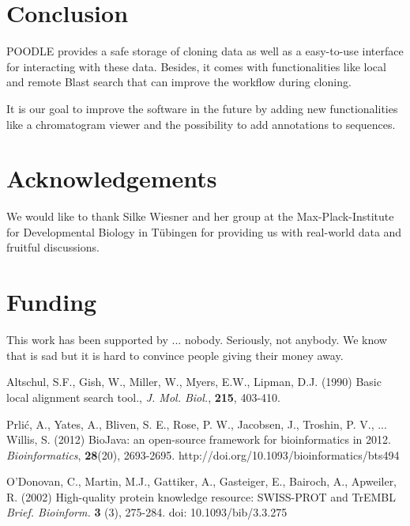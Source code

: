 \documentclass{bioinfo}
\begin{document}
\section{Conclusion}

POODLE provides a safe storage of cloning data as well as a easy-to-use interface for 
interacting with these data. Besides, it comes with functionalities like local and remote Blast 
search that can improve the workflow during cloning. 

It is our goal to improve the software in the future by adding new functionalities like a chromatogram 
viewer and the possibility to add annotations to sequences. 

\section*{Acknowledgements}

We would like to thank Silke Wiesner and her group at the Max-Plack-Institute for Developmental Biology 
in T\"{u}bingen for providing us with real-world data and fruitful discussions.

\section*{Funding}

This work has been supported by ... nobody. Seriously, not anybody. We know that is sad but it is hard 
to convince people giving their money away.

%
%
%
%
%
%
%
%
%


\begin{thebibliography}{}

Altschul, S.F., Gish, W., Miller, W., Myers, E.W., Lipman, D.J. (1990) Basic local alignment search tool., {\it J. Mol. Biol.}, {\bf 215}, 403-410.

Prli\'{c}, A., Yates, A., Bliven, S. E., Rose, P. W., Jacobsen, J., Troshin, P. V., ... Willis, S. (2012) BioJava: an open-source framework for bioinformatics in 2012. {\it Bioinformatics}, {\bf 28}(20), 2693-2695. http://doi.org/10.1093/bioinformatics/bts494

O'Donovan, C., Martin, M.J., Gattiker, A., Gasteiger, E., Bairoch, A., Apweiler, R. (2002) High-quality protein knowledge resource: SWISS-PROT and TrEMBL {\it Brief. Bioinform.}  {\bf 3} (3), 275-284. doi: 10.1093/bib/3.3.275 

\end{thebibliography}
\end{document}
